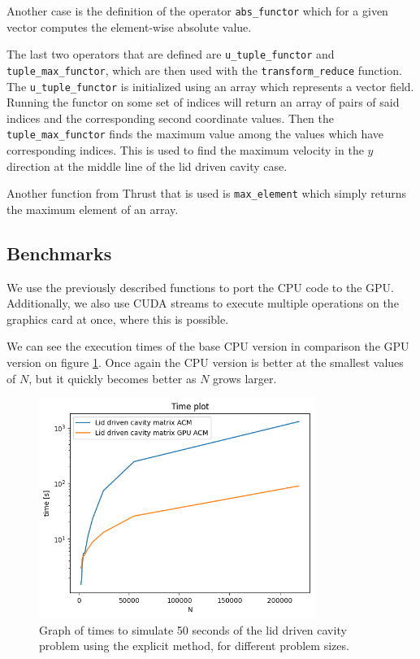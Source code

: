 \documentclass{article}
\begin{document}
Another case is the definition of the operator \verb|abs_functor| which for a given vector 
computes the element-wise absolute value.

The last two operators that are defined are \verb|u_tuple_functor| and \verb|tuple_max_functor|,
which are then used with the \verb|transform_reduce| function. The \verb|u_tuple_functor| is initialized
using an array which represents a vector field. Running the functor on some set of indices
will return an array of pairs of said indices and the corresponding second coordinate values.
Then the \verb|tuple_max_functor| finds the maximum value among the values which have corresponding 
indices. This is used to find 
the maximum velocity in the \(y\) direction at the middle line of the lid driven cavity case.

Another function from Thrust that is used is \verb|max_element| which simply returns the 
maximum element of an array.
\subsection{Benchmarks}
We use the previously described functions to port the CPU code to the GPU. Additionally,
we also use CUDA streams to execute multiple operations on the graphics card at once, where 
this is possible. 

We can see the execution times of the base CPU version in comparison the GPU version on figure 
\ref{fig:lidDrivenACM_time}.
Once again the CPU version is better at the smallest values of \(N\), but it quickly becomes 
better as \(N\) grows larger.
\begin{figure}[h!] 
    \centering 
    \includegraphics[width=0.8\textwidth]{lidDrivenACM_time.png} 
    \caption{Graph of times to simulate 50 seconds of the lid driven cavity problem using
    the explicit method, for different problem sizes.} 
    \label{fig:lidDrivenACM_time} 
\end{figure}
\end{document}
